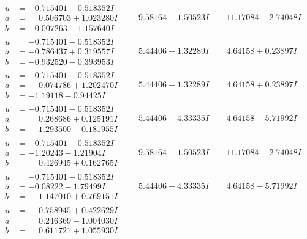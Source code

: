 \documentclass[1p]{elsarticle_modified}
\theoremstyle{definition}
\begin{document}
$$\begin{array}{c|c|c}
\begin{aligned}
u &= -0.715401 - 0.518352 I \\
a &= \phantom{-}0.506703 + 1.023280 I \\
b &= -0.007263 - 1.157640 I\end{aligned}
 & \phantom{-}9.58164 + 1.50523 I & \phantom{-}11.17084 - 2.74048 I \\ \hline\begin{aligned}
u &= -0.715401 - 0.518352 I \\
a &= -0.786437 + 0.319557 I \\
b &= -0.932520 - 0.393953 I\end{aligned}
 & \phantom{-}5.44406 - 1.32289 I & \phantom{-}4.64158 + 0.23897 I \\ \hline\begin{aligned}
u &= -0.715401 - 0.518352 I \\
a &= \phantom{-}0.074786 + 1.202470 I \\
b &= -1.19118 - 0.94425 I\end{aligned}
 & \phantom{-}5.44406 - 1.32289 I & \phantom{-}4.64158 + 0.23897 I \\ \hline\begin{aligned}
u &= -0.715401 - 0.518352 I \\
a &= \phantom{-}0.268686 + 0.125191 I \\
b &= \phantom{-}1.293500 - 0.181955 I\end{aligned}
 & \phantom{-}5.44406 + 4.33335 I & \phantom{-}4.64158 - 5.71992 I \\ \hline\begin{aligned}
u &= -0.715401 - 0.518352 I \\
a &= -1.20243 - 1.21904 I \\
b &= \phantom{-}0.426945 + 0.162765 I\end{aligned}
 & \phantom{-}9.58164 + 1.50523 I & \phantom{-}11.17084 - 2.74048 I \\ \hline\begin{aligned}
u &= -0.715401 - 0.518352 I \\
a &= -0.08222 - 1.79499 I \\
b &= \phantom{-}1.147010 + 0.769151 I\end{aligned}
 & \phantom{-}5.44406 + 4.33335 I & \phantom{-}4.64158 - 5.71992 I \\ \hline\begin{aligned}
u &= \phantom{-}0.758945 + 0.422629 I \\
a &= \phantom{-}0.246369 - 1.004030 I \\
b &= \phantom{-}0.611721 + 1.055930 I\end{aligned}

\end{array}$$
\end{document}
